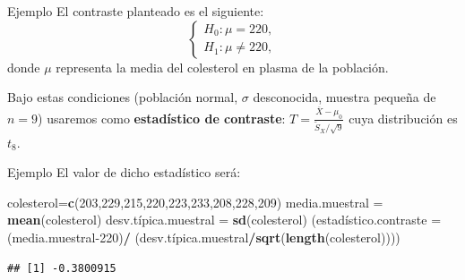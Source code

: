 \documentclass[
  ignorenonframetext,
]{beamer}
\newenvironment{Shaded}{\begin{snugshade}}{\end{snugshade}}
\newcommand{\DataTypeTok}[1]{\textcolor[rgb]{0.13,0.29,0.53}{#1}}
\newcommand{\DecValTok}[1]{\textcolor[rgb]{0.00,0.00,0.81}{#1}}
\newcommand{\KeywordTok}[1]{\textcolor[rgb]{0.13,0.29,0.53}{\textbf{#1}}}
\newcommand{\NormalTok}[1]{#1}
\newcommand{\OperatorTok}[1]{\textcolor[rgb]{0.81,0.36,0.00}{\textbf{#1}}}
\newcommand{\StringTok}[1]{\textcolor[rgb]{0.31,0.60,0.02}{#1}}
\begin{document}
\begin{frame}{Ejemplo}
\protect\hypertarget{ejemplo-10}{}
El contraste planteado es el siguiente: \[\left\{\begin{array}{l}
H_0:\mu=220,\\
H_1:\mu\neq 220,
\end{array}
\right.\] donde \(\mu\) representa la media del colesterol en plasma de
la población.

Bajo estas condiciones (población normal, \(\sigma\) desconocida,
muestra pequeña de \(n=9\)) usaremos como \textbf{estadístico de
contraste}: \(T= \frac{\overline{X}-\mu_0}{{\widetilde{S}_X}/{\sqrt9}}\)
cuya distribución es \(t_8\).
\end{frame}

\begin{frame}[fragile]{Ejemplo}
\protect\hypertarget{ejemplo-11}{}
El valor de dicho estadístico será:

\begin{Shaded}
\begin{Highlighting}[]
\NormalTok{colesterol=}\KeywordTok{c}\NormalTok{(}\DecValTok{203}\NormalTok{,}\DecValTok{229}\NormalTok{,}\DecValTok{215}\NormalTok{,}\DecValTok{220}\NormalTok{,}\DecValTok{223}\NormalTok{,}\DecValTok{233}\NormalTok{,}\DecValTok{208}\NormalTok{,}\DecValTok{228}\NormalTok{,}\DecValTok{209}\NormalTok{)}
\NormalTok{media.muestral =}\StringTok{ }\KeywordTok{mean}\NormalTok{(colesterol)}
\NormalTok{desv.típica.muestral =}\StringTok{ }\KeywordTok{sd}\NormalTok{(colesterol)}
\NormalTok{(estadístico}\DataTypeTok{.contraste =}\NormalTok{ (media.muestral}\DecValTok{{-}220}\NormalTok{)}\OperatorTok{/}
\StringTok{    }\NormalTok{(desv.típica.muestral}\OperatorTok{/}\KeywordTok{sqrt}\NormalTok{(}\KeywordTok{length}\NormalTok{(colesterol))))}
\end{Highlighting}
\end{Shaded}

\begin{verbatim}
## [1] -0.3800915
\end{verbatim}
\end{frame}
\end{document}
